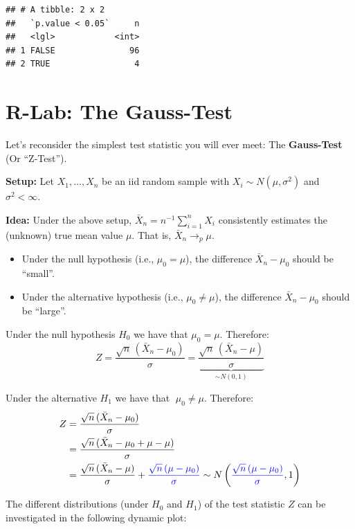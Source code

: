 \documentclass[]{book}
\providecommand{\tightlist}{%
  \setlength{\itemsep}{0pt}\setlength{\parskip}{0pt}}
\theoremstyle{definition}
\theoremstyle{definition}
\theoremstyle{definition}
\theoremstyle{remark}
\begin{document}
\begin{verbatim}
## # A tibble: 2 x 2
##   `p.value < 0.05`     n
##   <lgl>            <int>
## 1 FALSE               96
## 2 TRUE                 4
\end{verbatim}

\hypertarget{r-lab-the-gauss-test}{%
\section{R-Lab: The Gauss-Test}\label{r-lab-the-gauss-test}}

Let's reconsider the simplest test statistic you will ever meet: The \textbf{Gauss-Test} (Or ``Z-Test'').

\textbf{Setup:} Let \(X_1,\dots,X_n\) be an iid random sample with \(X_i\sim N(\mu,\sigma^2)\) and \(\sigma^2<\infty.\)

\textbf{Idea:} Under the above setup, \(\bar{X}_n=n^{-1}\sum_{i=1}^n X_i\) consistently estimates the (unknown) true mean value \(\mu\). That is, \(\bar{X}_n\to_p\mu\).

\begin{itemize}
\tightlist
\item
  Under the null hypothesis (i.e., \(\mu_{0}=\mu\)), the difference \(\bar{X}_n-\mu_{0}\) should be ``small''.
\item
  Under the alternative hypothesis (i.e., \(\mu_{0}\neq\mu\)), the difference \(\bar{X}_n-\mu_{0}\) should be ``large''.
\end{itemize}

Under the null hypothesis \(H_0\) we have that \(\mu_{0}=\mu\). Therefore:
\[
Z=\frac{\sqrt{n}\,(\bar{X}_n-\mu_{0})}{\sigma}=\underbrace{\frac{\sqrt{n}\,(\bar{X}_n-\mu)}{\sigma}}_{\sim N(0,1)}
\]

Under the alternative \(H_1\) we have that \(\;\mu_{0}\neq \mu\). Therefore:
\begin{align*}
Z&=\frac{\sqrt{n}\,(\bar{X}_n-\mu_{0})}{\sigma}\\
&=\frac{\sqrt{n}\,(\bar{X}_n-\mu_{0}+\mu-\mu)}{\sigma}\\
&=\frac{\sqrt{n}\,(\bar{X}_n-\mu)}{\sigma}+{\color{blue}{ \frac{\sqrt{n}\,(\mu-\mu_{0})}{\sigma} }} \sim N\left({\color{blue}{\frac{\sqrt{n}\,(\mu-\mu_{0})}{\sigma}}},1\right)
\end{align*}

The different distributions (under \(H_0\) and \(H_1\)) of the test statistic \(Z\) can be investigated in the following dynamic plot:
\end{document}
